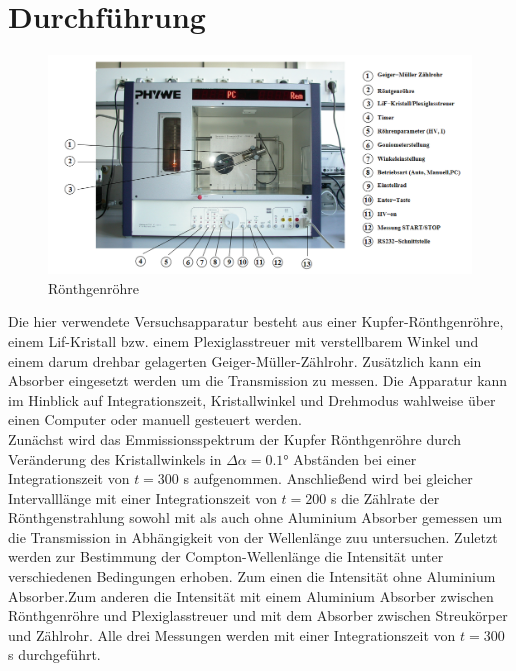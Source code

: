 \section{Durchführung}
\begin{figure} [h!]
    \centering
    \includegraphics[width=14cm, keepaspectratio]{Compton Effekt Versuchapparatur}
    \caption{Rönthgenröhre}
    \label{fig:Rönthgenröhre}
 \end{figure}
Die hier verwendete Versuchsapparatur besteht aus einer Kupfer-Rönthgenröhre, einem Lif-Kristall bzw. einem Plexiglasstreuer mit verstellbarem Winkel und einem darum drehbar gelagerten Geiger-Müller-Zählrohr. Zusätzlich kann ein Absorber eingesetzt werden um die Transmission zu messen. Die Apparatur kann im Hinblick auf Integrationszeit, Kristallwinkel und Drehmodus wahlweise über einen Computer oder manuell gesteuert werden. \\
Zunächst wird das Emmissionsspektrum der Kupfer Rönthgenröhre durch Veränderung des Kristallwinkels in $\Delta \alpha=0.1$° Abständen bei einer Integrationszeit von $t=300$ s aufgenommen. Anschließend wird bei gleicher Intervalllänge mit einer Integrationszeit von $t=200$ s die Zählrate der Rönthgenstrahlung sowohl mit als auch ohne Aluminium Absorber gemessen um die Transmission in Abhängigkeit von der Wellenlänge zuu untersuchen. Zuletzt werden zur Bestimmung der Compton-Wellenlänge die Intensität unter verschiedenen Bedingungen erhoben. Zum einen die Intensität ohne Aluminium Absorber.Zum anderen die Intensität mit einem Aluminium Absorber zwischen Rönthgenröhre und Plexiglasstreuer und mit dem Absorber zwischen Streukörper und Zählrohr. Alle drei Messungen werden mit einer Integrationszeit von $t=300$ s durchgeführt. 
